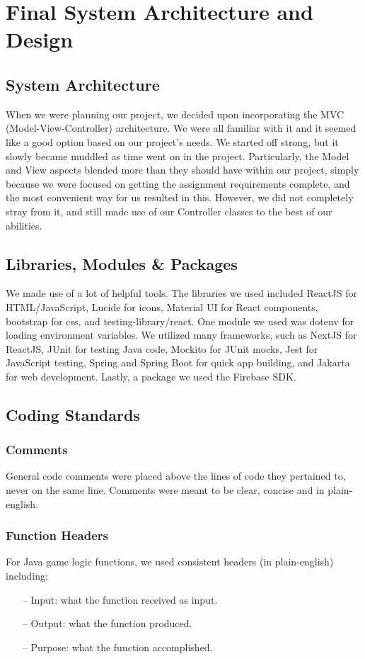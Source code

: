 \section{Final System Architecture and Design}

\subsection{System Architecture}
When we were planning our project, we decided upon incorporating the MVC (Model-View-Controller) architecture. We were all familiar with it and it seemed like a good option based on our project's needs. We started off strong, but it slowly became muddled as time went on in the project. Particularly, the Model and View aspects blended more than they should have within our project, simply because we were focused on getting the assignment requirements complete, and the most convenient way for us resulted in this. However, we did not completely stray from it, and still made use of our Controller classes to the best of our abilities.

\subsection{Libraries, Modules \& Packages}
\label{sec:libs/mods/packs}
We made use of a lot of helpful tools. The libraries we used included ReactJS for HTML/JavaScript, Lucide for icons, Material UI for React components, bootstrap for css, and testing-library/react. One module we used was dotenv for loading environment variables.
We utilized many frameworks, such as NextJS for ReactJS, JUnit for testing Java code, Mockito for JUnit mocks, Jest for JavaScript testing, Spring and Spring Boot for quick app building, and Jakarta for web development. Lastly, a package we used the Firebase SDK.

\subsection{Coding Standards}
\subsubsection{Comments}
General code comments were placed above the lines of code they pertained to, never on the same line. Comments were meant to be clear, concise and in plain-english.

\subsubsection{Function Headers}
For Java game logic functions, we used consistent headers (in plain-english) including:
\begin{itemize}
    \item [--] Input: what the function received as input.
    \item [--] Output: what the function produced.
    \item [--] Purpose: what the function accomplished.
\end{itemize}

